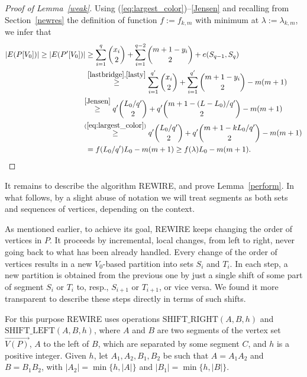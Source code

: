\documentclass[reqno, 12pt]{amsart}
\numberwithin{equation}{section}
\numberwithin{figure}{section}
\theoremstyle{plain}
\theoremstyle{definition}
\begin{document}
\begin{proof}[Proof of Lemma~\ref{weak}]
 Using (\ref{eq:largest_color})--\eqref{Jensen} and recalling from Section~\ref{newres} the definition of function $f:=f_{k,m}$ with minimum at $\lambda:=\lambda_{k,m}$,
we infer that
\begin{align*}
    |E(P[V_0])| \geq |E(P'[V_0])| & \geq  \sum_{i=1}^q {x_i \choose 2} + \sum_{i=1}^{q-2} {m+1-y_i\choose 2}+e(S_{q-1},S_q) \\
    &\overset{\eqref{lastbridge},\eqref{lasty}}{\geq }\sum_{i=1}^{q'} {x_i \choose 2} + \sum_{i=1}^{q'} {m+1-y_i\choose 2} - m(m+1)\\
    &\hspace{-0.15cm} \overset{\eqref{Jensen}}{\geq}  q'{L_0/q' \choose 2} + q'{m+1-(L-L_0)/q' \choose 2} -  m(m+1) \\
    &\hspace{-0.15cm} \overset{(\ref{eq:largest_color})}{\ge} q'{L_0/q'\choose 2} + q'{m+1-kL_0/q'\choose 2} -  m(m+1) \\
    & =  f(L_0/q')L_0 - m(m+1) \geq f(\lambda)L_0 - m(m+1).
\end{align*}
\end{proof}

It remains to describe the algorithm REWIRE, and prove Lemma~\ref{perform}.
In what follows, by a slight abuse of notation we will treat segments as both sets and sequences of vertices, depending on the context.


As mentioned earlier, to achieve its goal, REWIRE keeps changing the order of vertices in $P$. It proceeds by incremental, local changes, from left to right, never going back to what has been already handled. Every change of the order of vertices results in a new $V_0$-based partition into sets $S_i$ and $T_i$. In each step, a new partition is obtained from the previous one by just a single shift of some part of segment $S_i$ or $T_i$ to, resp., $S_{i+1}$ or $T_{i+1}$, or vice versa.
We found it more transparent to describe these steps directly in terms of such shifts.

 For this purpose REWIRE uses operations $\textrm{SHIFT\_RIGHT}(A,B,h)$ and \newline $\textrm{SHIFT\_LEFT}(A,B,h)$, where $A$ and $B$ are two segments of the vertex set $\overrightarrow{V(P)}$, $A$ to the left of $B$, which are separated by some segment $C$, and $h$ is a positive integer. Given $h$, let $A_1, A_2, B_1, B_2$ be such that $A=A_1A_2$ and $B=B_1B_2$, with $|A_2|=\min\{h,|A|\}$ and $|B_1|=\min\{h,|B|\}$.
\end{document}
